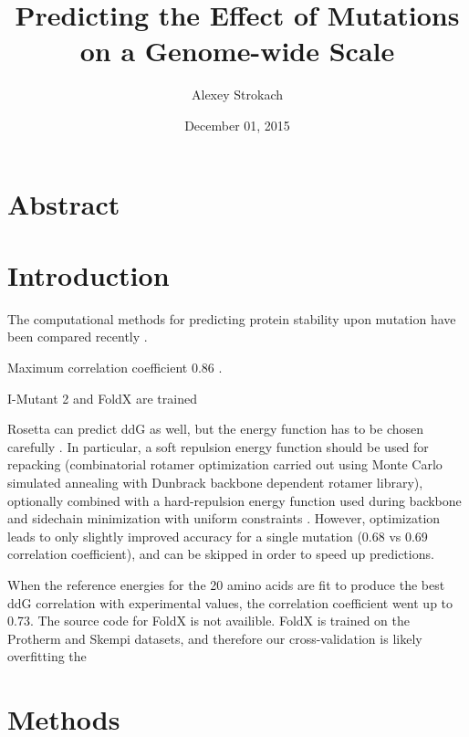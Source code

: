 \documentclass[11pt]{article}
\title{Predicting the Effect of Mutations on a Genome-wide Scale}
\author{Alexey Strokach}
\date{December 01, 2015}
\begin{document}
\onehalfspacing

\maketitle

\tableofcontents



\section*{Abstract}

\cite{pleasance_comprehensive_2010}

\cite{tennessen_evolution_2012}

\cite{lee_mutation_2010}



\newpage
\section{Introduction}

The computational methods for predicting protein stability upon mutation have been compared recently \cite{Potapov2009}.

Maximum correlation coefficient 0.86 \cite{Potapov2009}.

I-Mutant 2 and FoldX are trained

Rosetta can predict ddG as well, but the energy function has to be chosen carefully \cite{Kellogg2011}. In particular, a soft repulsion energy function should be used for repacking (combinatorial rotamer optimization carried out using Monte Carlo simulated annealing with Dunbrack backbone dependent rotamer library), optionally combined with a hard-repulsion energy function used during backbone and sidechain minimization with uniform constraints \cite{Kellogg2011}. However, optimization leads to only slightly improved accuracy for a single mutation (0.68 vs 0.69 correlation coefficient), and can be skipped in order to speed up predictions. 

When the reference energies for the 20 amino acids are fit to produce the best ddG correlation with experimental values, the correlation coefficient went up to 0.73. 
The source code for FoldX is not availible. FoldX is trained on the Protherm and Skempi datasets, and therefore our cross-validation is likely overfitting the 



\section{Methods}
\end{document}
